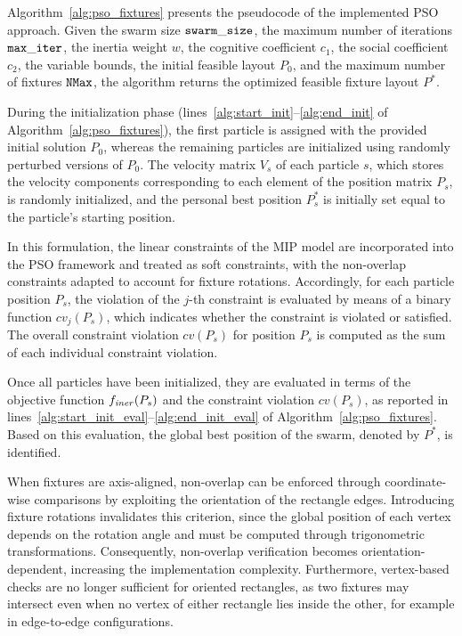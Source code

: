 Algorithm~\ref{alg:pso_fixtures} presents the pseudocode of the implemented PSO approach. Given the swarm size $\mathtt{swarm\_size}$, the maximum number of iterations $\mathtt{max\_iter}$, the inertia weight $w$, the cognitive coefficient $c_1$, the social coefficient $c_2$, the variable bounds, the initial feasible layout $P_0$, and the maximum number of fixtures $\mathtt{NMax}$, the algorithm returns the optimized feasible fixture layout $P^*$.

During the initialization phase (lines~\ref{alg:start_init}--\ref{alg:end_init} of Algorithm~\ref{alg:pso_fixtures}), the first particle is assigned with the provided initial solution $P_0$, whereas the remaining particles are initialized using randomly perturbed versions of $P_0$. The velocity matrix $V_s$ of each particle $s$, which stores the velocity components corresponding to each element of the position matrix $P_s$, is randomly initialized, and the personal best position $P^*_s$ is initially set equal to the particle’s starting position.

In this formulation, the linear constraints of the MIP model are incorporated into the PSO framework and treated as soft constraints, with the non-overlap constraints adapted to account for fixture rotations. Accordingly, for each particle position $P_s$, the violation of the $j$-th constraint is evaluated by means of a binary function $cv_j(P_s)$, which indicates whether the constraint is violated or satisfied. The overall constraint violation $cv(P_s)$ for position $P_s$ is computed as the sum of each individual constraint violation.

Once all particles have been initialized, they are evaluated in terms of the objective function $f_\mathit{iner}(P_s)$ and the constraint violation $cv(P_s)$, as reported in lines~\ref{alg:start_init_eval}--\ref{alg:end_init_eval} of Algorithm~\ref{alg:pso_fixtures}. Based on this evaluation, the global best position of the swarm, denoted by $P^*$, is identified.

When fixtures are axis-aligned, non-overlap can be enforced through coordinate-wise comparisons by exploiting the orientation of the rectangle edges. Introducing fixture rotations invalidates this criterion, since the global position of each vertex depends on the rotation angle and must be computed through trigonometric transformations. Consequently, non-overlap verification becomes orientation-dependent, increasing the implementation complexity. Furthermore, vertex-based checks are no longer sufficient for oriented rectangles, as two fixtures may intersect even when no vertex of either rectangle lies inside the other, for example in edge-to-edge configurations.

